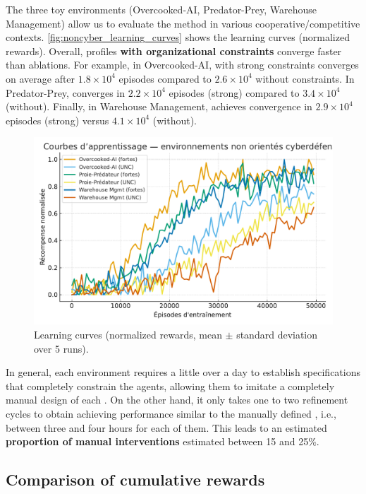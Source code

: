 The three toy environments (Overcooked-AI, Predator-Prey, Warehouse Management) allow us to evaluate the  method in various cooperative/competitive contexts.
\autoref{fig:noncyber_learning_curves} shows the learning curves (normalized rewards).
Overall, profiles \textbf{with organizational constraints} converge faster than  ablations.
For example, in Overcooked-AI,  with strong constraints converges on average after $1.8\times 10^4$ episodes compared to $2.6\times 10^4$ without constraints.
In Predator-Prey,  converges in $2.2\times 10^4$ episodes (strong) compared to $3.4\times 10^4$ (without).
Finally, in Warehouse Management,  achieves convergence in $2.9\times 10^4$ episodes (strong) versus $4.1\times 10^4$ (without).

\begin{figure}[h!]
  \centering
  \includegraphics[width=0.75\linewidth]{figures/results_noncyber_learning.pdf}
  \caption{Learning curves (normalized rewards, mean $\pm$ standard deviation over 5 runs).}
  \label{fig:noncyber_learning_curves}
\end{figure}

In general, each environment requires a little over a day to establish specifications that completely constrain the agents, allowing them to imitate a completely manual design of each . On the other hand, it only takes one to two refinement cycles to obtain  achieving performance similar to the manually defined , i.e., between three and four hours for each of them. This leads to an estimated \textbf {proportion of manual interventions} estimated between 15 and 25\%.




\subsection*{Comparison of cumulative rewards}

